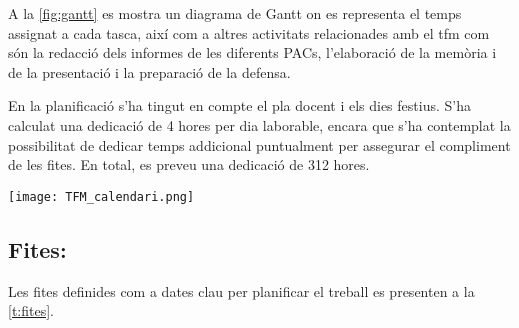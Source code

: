 \documentclass[CAT,BIB]{TFUOC}%
\begin{document}
            A la \cref{fig:gantt} es mostra un diagrama de Gantt
            on es representa el temps assignat a cada tasca,
            així com a altres activitats relacionades amb el \gls{tfm}
            com són la redacció dels informes de les diferents PACs,
            l'elaboració de la memòria i de la presentació
            i la preparació de la defensa.

            En la planificació
            s'ha tingut en compte el pla docent i els dies festius.
            S'ha calculat una dedicació de 4 hores per dia laborable,
            encara que s'ha contemplat la possibilitat de dedicar temps addicional puntualment
            per assegurar el compliment de les fites.
            En total, es preveu una dedicació de 312 hores.

            \begin{sidewaysfigure}[p]
                \centering
                \texttt{[image: TFM\_calendari.png]}
                \caption[Calendari: diagrama de Gantt]{Diagrama de Gantt:
                planificació dels objectius i tasques.}
                \label{fig:gantt}
            \end{sidewaysfigure}

        \subsection{Fites:}
        \label{sec:fites}

            Les fites definides
            com a dates clau per planificar el treball
            es presenten a la \cref{t:fites}.
\end{document}
